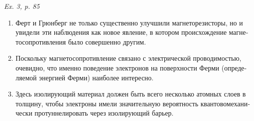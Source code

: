 \documentclass[a4paper, 12pt]{article}
\def\task#1{\begin{center}\it #1\end{center}}
\newif\ifcols
\begin{document}
\task{Ex. 3, p. 85}
\ifcols\begin{multicols}{2}\fi%
	\begin{otherlanguage}{russian}
		\begin{enumerate}[label=\alph*)]
			\item Ферт и Грюнберг не только существенно улучшили 
				магнеторезисторы, но и увидели эти наблюдения как новое 
				явление, в котором происхождение магнетосопротивления было 
				совершенно другим.

			\item Поскольку магнетосопротивление связано с электрической 
				проводимостью, очевидно, что именно поведение электронов 
				на поверхности Ферми (определяемой энергией Ферми) 
				наиболее интересно.

			\item Здесь изолирующий материал должен быть всего несколько 
				атомных слоев в толщину, чтобы электроны имели 
				значительную вероятность квантовомеханически 
				протуннелировать через изолирующий барьер.
		\end{enumerate}
	\end{otherlanguage}
\ifcols\end{multicols}\fi%
\end{document}
